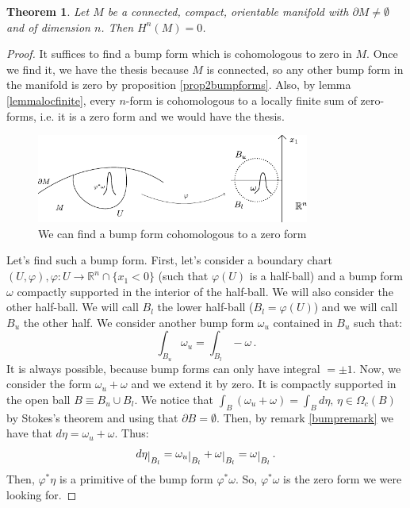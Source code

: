 \documentclass[a4paper,11pt,titlepage, article, oneside]{memoir}
\numberwithin{equation}{section}
\newtheorem{theorem}{Theorem}[section]
\theoremstyle{definition}
\theoremstyle{remark}
\newcommand{\rfield}{\mathbb{R}}
\newcommand{\restrict}[2]{{#1}\raisebox{-.5ex}{$|$}_{#2}}
\begin{document}
\begin{theorem}
Let $M$ be a connected, compact, orientable manifold with $\partial M \not = \emptyset$ and of dimension $n$. Then $H^n(M) = 0$.
\end{theorem}
\begin{proof}
It suffices to find a bump form which is cohomologous to zero in $M$. Once we find it, we have the thesis because $M$ is connected, so any other bump form in the manifold is zero by proposition \ref{prop2bumpforms}. Also, by lemma \ref{lemmalocfinite}, every $n$-form is cohomologous to a locally finite sum of zero-forms, i.e. it is a zero form and we would have the thesis.
\begin{figure}[H] \label{Fig:bumpforms2}
     \centering
     \includegraphics[width=0.8\textwidth]{Images/bumpforms2.pdf}
     \caption{We can find a bump form cohomologous to a zero form}
\end{figure}
Let's find such a bump form. First, let's consider a boundary chart $(U, \varphi), \varphi \colon U \rightarrow \rfield^n \cap \{x_1 < 0\}$ (such that $\varphi(U)$ is a half-ball) and a bump form $\omega$ compactly supported in the interior of the half-ball. We will also consider the other half-ball. We will call $B_l$ the lower half-ball ($B_l = \varphi(U)$) and we will call $B_u$ the other half. We consider another bump form $\omega_u$ contained in $B_u$ such that:
\[ \int_{B_u} \omega_u = \int_{B_l} - \omega \, . \]
It is always possible, because bump forms can only have integral $=\pm 1$.
Now, we consider the form $\omega_u + \omega$ and we extend it by zero. It is compactly supported in the open ball $B \equiv B_u \cup B_l$. We notice that $\int_{B} (\omega_u + \omega) = \int_B d\eta, \, \eta \in \Omega_c(B)$ by Stokes's theorem and using that $\partial B =\emptyset$. Then, by remark \ref{bumpremark} we have that $d\eta = \omega_u + \omega$. Thus:
\[ \restrict{d\eta}{B_l} = \restrict{\omega_u}{B_l} + \restrict{\omega}{B_l} = \restrict{\omega}{B_l} \, . \]
Then, $\varphi^* \eta$ is a primitive of the bump form $\varphi^* \omega$. So, $\varphi^* \omega$ is the zero form we were looking for.
\end{proof}
\end{document}
